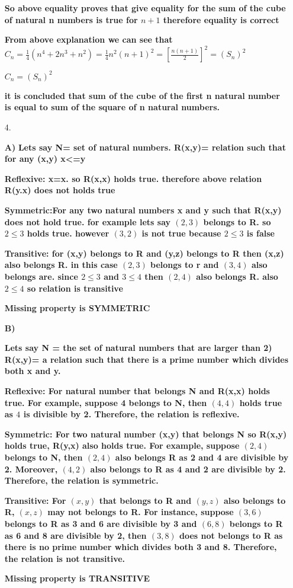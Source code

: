 \documentclass[11pt]{article}
\theoremstyle{thmstyle}
\begin{document}
\begin{itemize}
{\textbf{So above equality proves that give equality for the sum of the cube of natural n numbers is true for $n+1$ therefore equality is correct}}

{\textbf{From above explanation we can see that 
$C_n= \frac{1}{4}(n^4+2n^3+n^2) = \frac{1}{4} n^2(n+1)^2 = [\frac{n(n+1)}{2}]^2 =(S_n)^2$}}

{\textbf{$C_n=(S_n)^2$}}

{\textbf{it is concluded that sum of the cube of the first n natural number is equal to sum of the square of n natural numbers.}}


\item[4.]  

{\textbf{A)}}
{\textbf{Lets say N= set of natural numbers. R(x,y)= relation such that for any (x,y) x<=y}}

{\textbf{Reflexive: x=x. so R(x,x) holds true. therefore above relation R(y.x) does not holds true}}

{\textbf{Symmetric:For any two natural numbers x and y such that R(x,y) does not hold true.  for example lets say $(2,3)$ belongs to R. so $2\leq3 $ holds true. 
however $(3,2)$ is not true because $2\leq3 $ is false}}

{\textbf{Transitive: for (x,y) belongs to R and (y,z) belongs to R then (x,z) also belongs R.
in this case $(2,3)$ belongs to r and $(3,4)$ also belongs are. since $2\leq3$ and $3\leq4$ then $(2,4)$ also belongs R. also $2\leq4$ so relation is transitive}}

{\textbf{Missing property is SYMMETRIC}}


{\textbf{B)}}

{\textbf{Lets say N = the set of natural numbers that are larger than 2)
R(x,y)= a relation such that there is a prime number which divides both x and y.}}

{\textbf{Reflexive: For natural number that belongs N and R(x,x) holds true.  For example, suppose 4 belongs to N, then $(4,4)$ holds true as $4$ is divisible by 2. Therefore, the relation is reflexive.}}

{\textbf{Symmetric: For two natural number (x,y) that belongs N so R(x,y) holds true, R(y,x) also holds true.
For example, suppose $(2,4)$ belongs to N, then $(2,4)$ also belongs R as 2 and 4 are divisible by 2. Moreover, $(4,2)$ also belongs to R as 4 and 2 are divisible by 2.
Therefore, the relation is symmetric. }}

{\textbf{Transitive: For $(x,y)$ that belongs to R and $(y,z)$ also belongs to R, $(x,z)$ may not belongs to R.
For instance, suppose $(3,6)$ belongs to R as 3 and 6 are divisible by 3 and $(6,8)$ belongs to R as 6 and 8 are divisible by 2, then $(3,8)$ does not belongs to R as there is no prime number which divides both 3 and 8.
Therefore, the relation is not transitive.}}

{\textbf{Missing property is TRANSITIVE }}







\begin{align*}
\end{align*}
\end{itemize}
\end{document}
